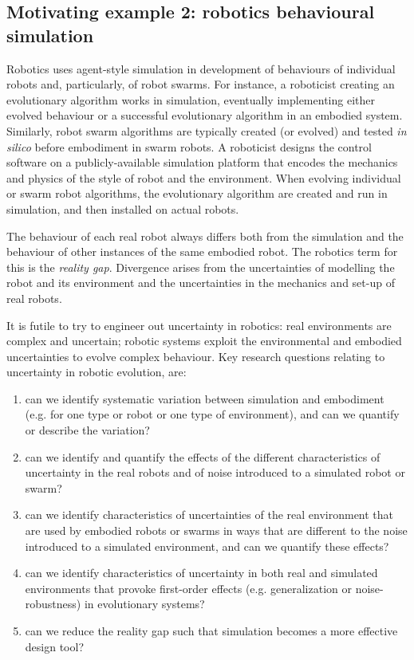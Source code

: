 \documentclass[sigconf,authordraft]{acmart}
\begin{document}
\subsection{Motivating example 2: robotics behavioural simulation}

Robotics uses agent-style simulation in development of behaviours of  individual robots and, particularly, of robot swarms. For instance, a roboticist creating an evolutionary algorithm works in simulation, eventually implementing either evolved behaviour or a successful evolutionary algorithm in an embodied system.  Similarly, robot swarm algorithms are typically created (or evolved) and tested \emph{in silico} before embodiment in swarm robots.  A roboticist designs the control software on a publicly-available simulation platform that encodes the mechanics and physics of the style of robot and the environment.  When evolving individual or swarm robot algorithms, the evolutionary algorithm are created and run in simulation, and then installed on actual robots.  

The behaviour of each real robot always differs both from the simulation and the behaviour of other instances of the same embodied robot.  The robotics term for this is the \emph{reality gap}.  Divergence arises from the uncertainties of modelling the robot and its environment and the uncertainties in the mechanics and set-up of real robots.  

It is futile to  try to engineer out uncertainty in robotics: real environments are complex and uncertain; robotic systems exploit the environmental and embodied uncertainties to evolve complex behaviour.  
Key research questions relating to uncertainty in robotic evolution, are:
\begin{enumerate}
\item can we identify systematic variation between simulation and embodiment (e.g. for one type or robot or one type of environment), and can we quantify or describe the variation?
\item can we identify and quantify the effects of the different characteristics of uncertainty in the real robots and of noise introduced to a simulated robot or swarm?
\item can we identify characteristics of uncertainties of the real environment that are used by embodied robots or swarms in ways that are different to the noise introduced to a simulated environment, and can we quantify these effects?

\item can we identify characteristics of uncertainty in both real and simulated environments that provoke first-order effects (e.g. generalization or noise-robustness) in evolutionary systems? 
\item can we reduce the reality gap such that simulation becomes a more effective design tool?
\end{enumerate}
\end{document}
